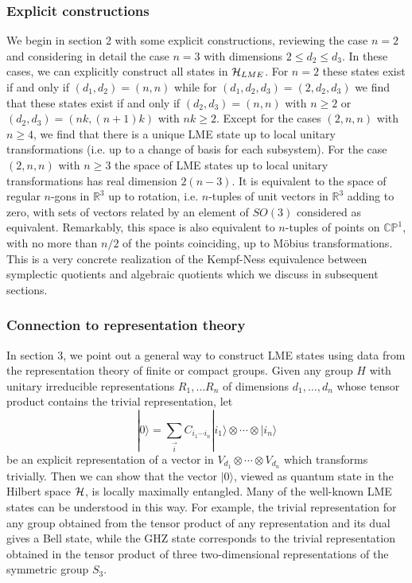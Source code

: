 \documentclass[12pt]{article}
\theoremstyle{definition}
\newcommand{\be}{\begin{equation}}
\newcommand{\ee}{\end{equation}}
\begin{document}
\subsubsection*{Explicit constructions}

We begin in section 2 with some explicit constructions, reviewing the
case $n=2$ and considering in detail the case $n=3$ with dimensions $2
\le d_2 \le d_3$. In these cases, we can explicitly construct all
states in ${\cal H}_{LME}$. For $n=2$ these states exist if and only
if $(d_1,d_2) = (n,n)$ while for $(d_1, d_2, d_3) = (2,d_2,d_3)$ we
find that these states exist if and only if $(d_2,d_3) = (n,n)$ with
$n \ge 2$ or $(d_2,d_3) = (nk,(n+1)k)$ with $nk \ge 2$. Except for the
cases $(2,n,n)$ with $n \ge 4$, we find that there is a unique LME
state up to local unitary transformations (i.e. up to a change of
basis for each subsystem). For the case $(2,n,n)$ with $n \ge 3$ the
space of LME states up to local unitary transformations has real
dimension $2(n-3)$. It is equivalent to the space of regular $n$-gons
in $\mathbb{R}^{3}$ up to rotation, i.e. $n$-tuples of unit vectors in
$\mathbb{R}^3$ adding to zero, with sets of vectors related by an
element of $SO(3)$ considered as equivalent. Remarkably, this space is
also equivalent to $n$-tuples of points on $\mathbb{CP}^{1}$, with no
more than $n/2$ of the points coinciding, up to M\"obius
transformations. This is a very concrete realization of the
Kempf-Ness equivalence between symplectic quotients and algebraic
quotients which we discuss in subsequent sections.

\subsubsection*{Connection to representation theory}

In section 3, we point out a general way to construct LME states using data from the representation theory of finite or compact groups. Given any group $H$ with unitary irreducible representations $R_1,\dots R_n$ of dimensions $d_1, \dots, d_n$ whose tensor product contains the trivial representation, let
\be
|0 \rangle = \sum_{\vec{i}} C_{i_1 \cdots i_n} |i_1 \rangle \otimes \cdots \otimes |i_n \rangle
\ee
be an explicit representation of a vector in $V_{d_1} \otimes \cdots \otimes V_{d_n}$ which transforms trivially. Then we can show that the vector $|0 \rangle$, viewed as quantum state in the Hilbert space ${\cal H}$, is locally maximally entangled. Many of the well-known LME states can be understood in this way. For example, the trivial representation for any group obtained from the tensor product of any representation and its dual gives a Bell state, while the GHZ state corresponds to the trivial representation obtained in the tensor product of three two-dimensional representations of the symmetric group $S_3$.
\end{document}

